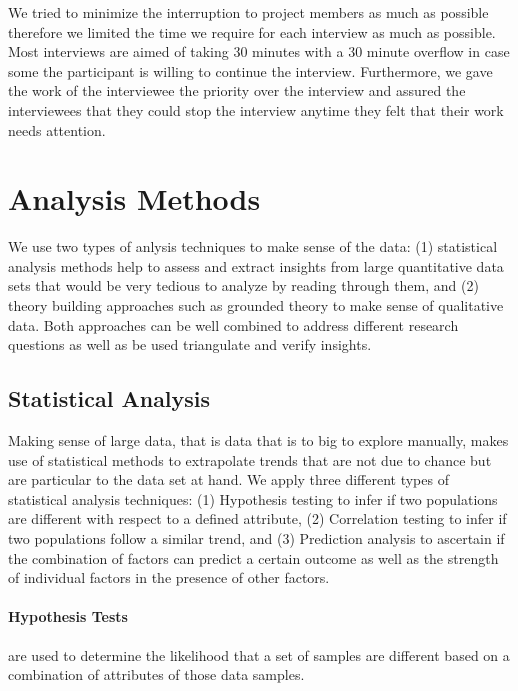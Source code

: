 We tried to minimize the interruption to project members as much as possible therefore we limited the time we require for each interview as much as possible.
Most interviews are aimed of taking 30 minutes with a 30 minute overflow in case some the participant is willing to continue the interview.
Furthermore, we gave the work of the interviewee the priority over the interview and assured the interviewees that they could stop the interview anytime they felt that their work needs attention.

\section{Analysis Methods}
We use two types of anlysis techniques to make sense of the data: (1) statistical analysis methods help to assess and extract insights from large quantitative data sets that would be very tedious to analyze by reading through them, and (2) theory building approaches such as grounded theory to make sense of qualitative data.
Both approaches can be well combined to address different research questions as well as be used triangulate and verify insights.

\subsection{Statistical Analysis}
Making sense of large data, that is data that is to big to explore manually, makes use of statistical methods to extrapolate trends that are not due to chance but are particular to the data set at hand.
We apply three different types of statistical analysis techniques: (1) Hypothesis testing to infer if two populations are different with respect to a defined attribute, (2) Correlation testing to infer if two populations follow a similar trend, and (3) Prediction analysis to ascertain if the combination of factors can predict a certain outcome as well as the strength of individual factors in the presence of other factors. 

\paragraph{Hypothesis Tests} are used to determine the likelihood that a set of samples are different based on a combination of attributes of those data samples.


